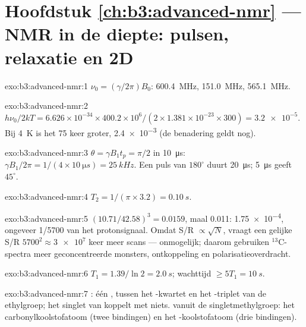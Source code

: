\section*{Hoofdstuk \ref{ch:b3:advanced-nmr} --- NMR in de diepte: pulsen, relaxatie en 2D}

\begin{solution}{exo:b3:advanced-nmr:1}
$\nu_0 = (\gamma/2\pi)B_0$:  \qty{600.4}{MHz},  \qty{151.0}{MHz}, 
\qty{565.1}{MHz}.
\end{solution}

\begin{solution}{exo:b3:advanced-nmr:2}
$h\nu_0/2kT = 6.626\times10^{-34} \times 400.2\times10^6/(2 \times 1.381\times10^{-23} \times 300)
= \num{3.2e-5}$. Bij \qty{4}{K} is het 75 keer groter, \num{2.4e-3} (de
benadering geldt nog).
\end{solution}

\begin{solution}{exo:b3:advanced-nmr:3}
$\theta = \gamma B_1t_p = \pi/2$ in \qty{10}{\micro s}: $\gamma B_1/2\pi = 1/(4 \times
\qty{10}{\micro s}) = \qty{25}{kHz}$. Een puls van $180^\circ$ duurt
\qty{20}{\micro s}; \qty{5}{\micro s}
geeft $45^\circ$.
\end{solution}

\begin{solution}{exo:b3:advanced-nmr:4}
$T_2 = 1/(\pi \times 3.2) = \qty{0.10}{s}$.
\end{solution}

\begin{solution}{exo:b3:advanced-nmr:5}
$(10.71/42.58)^3 = 0.0159$, maal 0.011: \num{1.75e-4}, ongeveer 1/5700 van
het protonsignaal. Omdat S/R $\propto\sqrt N$, vraagt een gelijke S/R
$5700^2 \approx \num{3e7}$ keer meer
scans --- onmogelijk; daarom gebruiken ${}^{13}$C-spectra meer
geconcentreerde monsters, ontkoppeling en polarisatieoverdracht.
\end{solution}

\begin{solution}{exo:b3:advanced-nmr:6}
$T_1 = 1.39/\ln2 = \qty{2.0}{s}$; wachttijd $\ge 5T_1 = \qty{10}{s}$.
\end{solution}

\begin{solution}{exo:b3:advanced-nmr:7}
: één , tussen het -kwartet en het -triplet van
de ethylgroep; het singlet van  koppelt met niets.  vanuit
de singletmethylgroep: het carbonylkoolstofatoom (twee bindingen) en het
-koolstofatoom (drie bindingen).
\end{solution}

